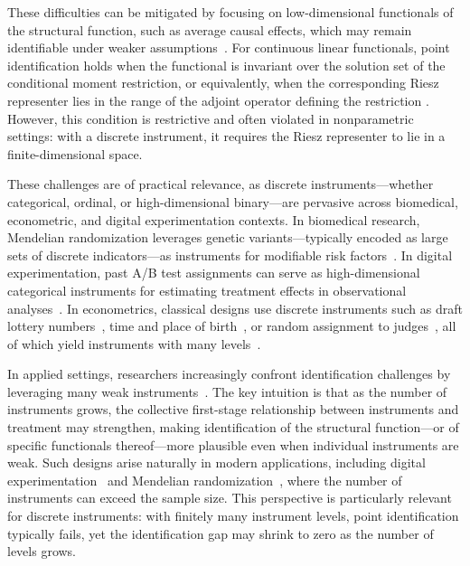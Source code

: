 \documentclass[11pt]{article}
\theoremstyle{plain}
\theoremstyle{definition}
\theoremstyle{remark}
\theoremstyle{definition}
\begin{document}
These difficulties can be mitigated by focusing on low-dimensional functionals of the structural function, such as average causal effects, which may remain identifiable under weaker assumptions~\citep{severini2006some, blundell2007semi, bennett2023inference, bennett2023source}. For continuous linear functionals, point identification holds when the functional is invariant over the solution set of the conditional moment restriction, or equivalently, when the corresponding Riesz representer lies in the range of the adjoint operator defining the restriction \citep{severini2006some, carrasco2007linear, darolles2011nonparametric, chen2014local}. However, this condition is restrictive and often violated in nonparametric settings: with a discrete instrument, it requires the Riesz representer to lie in a finite-dimensional space.


  
 

 
 
These challenges are of practical relevance, as discrete instruments---whether categorical, ordinal, or high-dimensional binary---are pervasive across biomedical, econometric, and digital experimentation contexts.  In biomedical research, Mendelian randomization leverages genetic variants---typically encoded as large sets of discrete indicators---as instruments for modifiable risk factors~\citep{smith2004mendelian, vanderweele2014methodological, bowden2015mendelian, emdin2017mendelian, burgess2017interpreting}. In digital experimentation, past A/B test assignments can serve as high-dimensional categorical instruments for estimating treatment effects in observational analyses~\citep{peysakhovich2018learning, bibaut2024nonparametric}. In econometrics, classical designs use discrete instruments such as draft lottery numbers~\citep{angrist1990lifetime}, time and place of birth~\citep{angrist1991does}, or random assignment to judges~\citep{kling2006incarceration, dobbie2018effects}, all of which yield instruments with many levels~\citep{angrist1999jackknife, mikusheva2022inference, angrist2022machine}. 
 
 


In applied settings, researchers increasingly confront identification challenges
by leveraging many weak instruments~\citep{
staiger1994instrumental, stock2005asymptotic, bekker2005instrumental,
chao2005consistent, hansen2008estimation, bowden2015mendelian,
chernozhukov2015post, breunig2016adaptive, burgess2017interpreting,
ye2024genius}. The key intuition is that as the number of instruments grows, the
collective first-stage relationship between instruments and treatment may
strengthen, making identification of the structural function---or of specific
functionals thereof---more plausible even when individual instruments are weak.
Such designs arise naturally in modern applications, including digital
experimentation~\citep{peysakhovich2018learning} and Mendelian
randomization~\citep{burgess2017interpreting}, where the number of instruments
can exceed the sample size. This perspective is particularly relevant for
discrete instruments: with finitely many instrument levels, point identification
typically fails, yet the identification gap may shrink to zero as the number of
levels grows.
\end{document}

